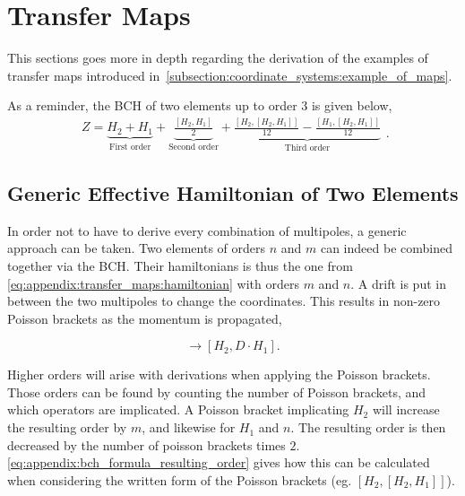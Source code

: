 \section{Transfer Maps}

This sections goes more in depth regarding the derivation of the examples of transfer maps 
introduced in~\cref{subsection:coordinate_systems:example_of_maps}.

As a reminder, the BCH of two elements up to order 3 is given below,
\small
\begin{equation}
    \begin{aligned}
      Z = \underbrace{H_{2} + H_{1}}_{\text{First order}}
        + \underbrace{\frac{\left[H_{2},H_{1}\right]}{2}}_{\text{Second order}}
        + \underbrace{\frac{\left[H_{2},\left[H_{2},H_{1}\right]\right]}{12} - \frac{\left[H_{1},\left[H_{2},H_{1}\right]\right]}{12}}_{\text{Third order}}
    \end{aligned}.
\end{equation}
\normalsize


\subsection{Generic Effective Hamiltonian of Two Elements}

In order not to have to derive every combination of multipoles, a generic approach can be taken.
Two elements of orders $n$ and $m$ can indeed be combined together via the BCH. Their hamiltonians
is thus the one from \cref{eq:appendix:transfer_maps:hamiltonian} with orders $m$ and $n$.
A drift is put in between the two multipoles to change the coordinates. This results in non-zero
Poisson brackets as the momentum is propagated,

\begin{equation}
  [H_2,H_1] \rightarrow [H_{2}, D \cdot H_{1}].
\end{equation}

Higher orders will arise with derivations when applying the Poisson brackets. Those orders can be 
found by counting the number of Poisson brackets, and which operators are implicated.
A Poisson bracket implicating $H_2$ will increase the resulting order by $m$, and likewise for $H_1$
and $n$. The resulting order is then decreased by the number of poisson brackets times $2$.
\cref{eq:appendix:bch_formula_resulting_order} gives how this can be calculated when considering
the written form of the Poisson brackets (eg. $[H_2, [H_2, H_1]]$).

